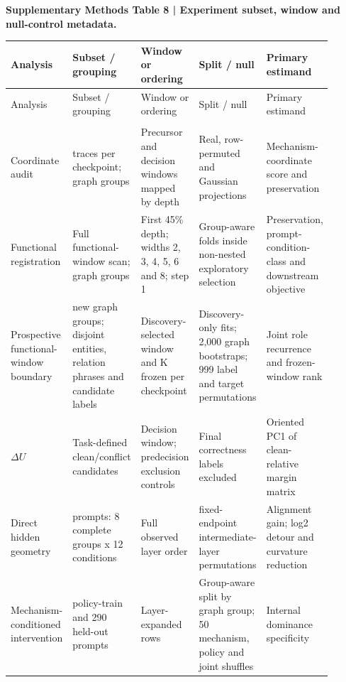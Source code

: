 \documentclass[10pt]{article}
\begin{document}
\begin{landscape}
\textbf{Supplementary Methods Table 8 | Experiment subset, window and null-control metadata.}


\fontsize{6}{6.6}\selectfont
\setlength{\tabcolsep}{2.5pt}
\renewcommand{\arraystretch}{1.08}
\begin{longtable}{@{}>{\RaggedRight\arraybackslash}p{0.180\linewidth}>{\RaggedRight\arraybackslash}p{0.180\linewidth}>{\RaggedRight\arraybackslash}p{0.180\linewidth}>{\RaggedRight\arraybackslash}p{0.180\linewidth}>{\RaggedRight\arraybackslash}p{0.180\linewidth}@{}}
\toprule
Analysis & Subset / grouping & Window or ordering & Split / null & Primary estimand \\
\midrule
\endfirsthead
\toprule
Analysis & Subset / grouping & Window or ordering & Split / null & Primary estimand \\
\midrule
\endhead
\midrule
\multicolumn{5}{r}{\footnotesize Continued on next page} \\
\endfoot
\bottomrule
\endlastfoot
Coordinate audit & 960 traces per checkpoint; graph groups & Precursor and decision windows mapped by depth & Real, row-permuted and Gaussian projections & Mechanism-coordinate score and preservation \\
Functional registration & Full functional-window scan; graph groups & First 45\% depth; widths 2, 3, 4, 5, 6 and 8; step 1 & Group-aware folds inside non-nested exploratory selection & Preservation, prompt-condition-class and downstream objective \\
Prospective functional-window boundary & 24 new graph groups; disjoint entities, relation phrases and candidate labels & Discovery-selected window and K frozen per checkpoint & Discovery-only fits; 2,000 graph bootstraps; 999 label and target permutations & Joint role recurrence and frozen-window rank \\
\(\Delta U\) & Task-defined clean/conflict candidates & Decision window; predecision exclusion controls & Final correctness labels excluded & Oriented PC1 of clean-relative margin matrix \\
Direct hidden geometry & 96 prompts: 8 complete groups x 12 conditions & Full observed layer order & 50 fixed-endpoint intermediate-layer permutations & Alignment gain; log2 detour and curvature reduction \\
Mechanism-conditioned intervention & 670 policy-train and 290 held-out prompts & Layer-expanded rows & Group-aware split by graph group; 50 mechanism, policy and joint shuffles & Internal dominance specificity \\

\end{longtable}
\end{landscape}
\end{document}
